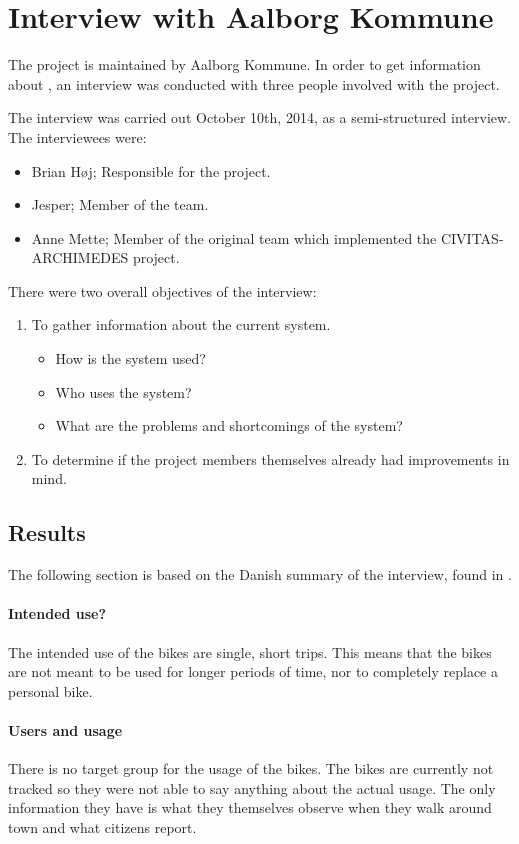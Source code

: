 \section{Interview with Aalborg Kommune}
The \citybike project is maintained by Aalborg Kommune.
In order to get information about \citybike, an interview was conducted with three people involved with the project.

The interview was carried out October 10th, 2014, as a semi-structured interview.
The interviewees were:
\begin{itemize}
\item Brian Høj; Responsible for the \citybike project.
\item Jesper; Member of the \citybike team.
\item Anne Mette; Member of the original team which implemented the CIVITAS-ARCHIMEDES project\cite{aalborgbycyklenbagcyklen}.
\end{itemize}

\noindent There were two overall objectives of the interview:
\begin{enumerate}
\item To gather information about the current system.
\begin{itemize}
\item How is the system used?
\item Who uses the system?
\item What are the problems and shortcomings of the system?
\end{itemize}
\item To determine if the project members themselves already had improvements in mind.
\end{enumerate}

\subsection{Results} \label{interview:goals}
The following section is based on the Danish summary of the interview, found in .

\paragraph{Intended use?}
The intended use of the bikes are single, short trips.
This means that the bikes are not meant to be used for longer periods of time, nor to completely replace a personal bike.

\paragraph{Users and usage}
There is no target group for the usage of the bikes.
The bikes are currently not tracked so they were not able to say anything about the actual usage.
The only information they have is what they themselves observe when they walk around town and what citizens report.

